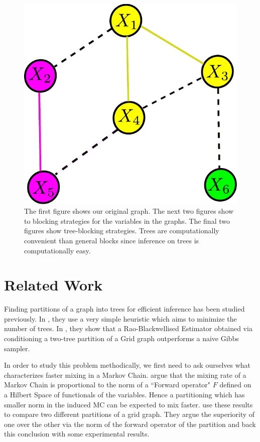 \documentclass{article} %
\begin{document}
\begin{figure}
\begin{center}
\includegraphics[width=\gimgwidth]{figures/tree2}
\end{center}
\caption{The first figure shows our original graph. The next two figures show to
blocking strategies for the variables in the graphs. The final two figures
show tree-blocking strategies. Trees are
computationally convenient than general blocks since inference on trees is
computationally easy.}
\label{fig:basefig}
\end{figure}

\section{Related Work}
Finding partitions of a graph into trees for efficient inference has been
studied previously. 
In \cite{rivasseau2005jungle}, they  use a very simple heuristic which
aims to minimize the number of trees. 
In \cite{hamze2004fields, hamze2006information}, they
show that a Rao-Blackwellised
Estimator obtained via conditioning a two-tree partition of a Grid graph
outperforms a naive Gibbs sampler.

In order to study this problem methodically, we first need to ask ourselves what
characterizes faster mixing in a Markov Chain.
\cite{liu01mcmcscicomp,liu94covargibbs} argue that the mixing rate of a
Markov Chain is proportional to the norm of a ``Forward operator" $F$ defined on
a Hilbert Space of functionals of the variables. Hence a partitioning which has
smaller norm in the induced MC can be expected to mix faster.
\cite{hamze2006information, hamze2004fields} use these results to compare two
different partitions of a grid graph. They argue the superiority
of one over the other via the norm of the forward operator of the 
partition and back this conclusion with some experimental results.
\end{document}
